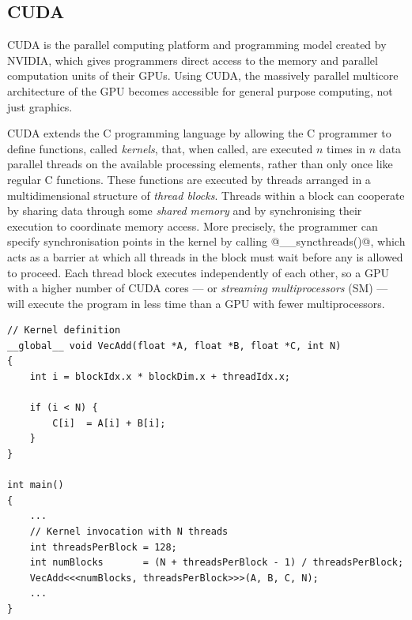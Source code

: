 \subsection{CUDA}
\label{sec:cuda}

CUDA is the parallel computing platform and programming model
created by NVIDIA, which gives programmers direct access to the memory and
parallel computation units of their GPUs. Using CUDA, the massively parallel
multicore architecture of the GPU becomes accessible for general purpose
computing, not just graphics.

CUDA extends the C programming language by allowing the C programmer to define
functions, called \emph{kernels}, that, when called, are
executed $n$ times in $n$ data parallel threads on the available processing
elements, rather than only once like regular C functions. These functions are
executed by threads arranged in a multidimensional structure of \emph{thread
blocks}. Threads within a block can cooperate by sharing
data through some \emph{shared memory} and by
synchronising their execution to coordinate memory access. More precisely, the
programmer can specify synchronisation points in the kernel by calling
@__syncthreads()@, which acts as a barrier at
which all threads in the block must wait before any is allowed to proceed. Each
thread block executes independently of each other, so a GPU with a higher number
of CUDA cores --- or \emph{streaming multiprocessors} (SM) --- will execute the program in less time than a GPU with
fewer multiprocessors.

\begin{lstlisting}[style=cuda_float
    ,label=lst:cuda_vecadd
    ,caption={[CUDA kernel for pair wise addition of two vectors]A CUDA kernel
        that illustrates pair wise addition of two vectors. The
        \code{__global__} keyword marks a function as a kernel that should be
        executed on the GPU in data parallel. The execution configuration syntax
        \code{<<<...>>>} specifies the number of threads that will each execute
        the function in data parallel.}]
// Kernel definition
__global__ void VecAdd(float *A, float *B, float *C, int N)
{
    int i = blockIdx.x * blockDim.x + threadIdx.x;

    if (i < N) {
        C[i]  = A[i] + B[i];
    }
}

int main()
{
    ...
    // Kernel invocation with N threads
    int threadsPerBlock = 128;
    int numBlocks       = (N + threadsPerBlock - 1) / threadsPerBlock;
    VecAdd<<<numBlocks, threadsPerBlock>>>(A, B, C, N);
    ...
}
\end{lstlisting}


